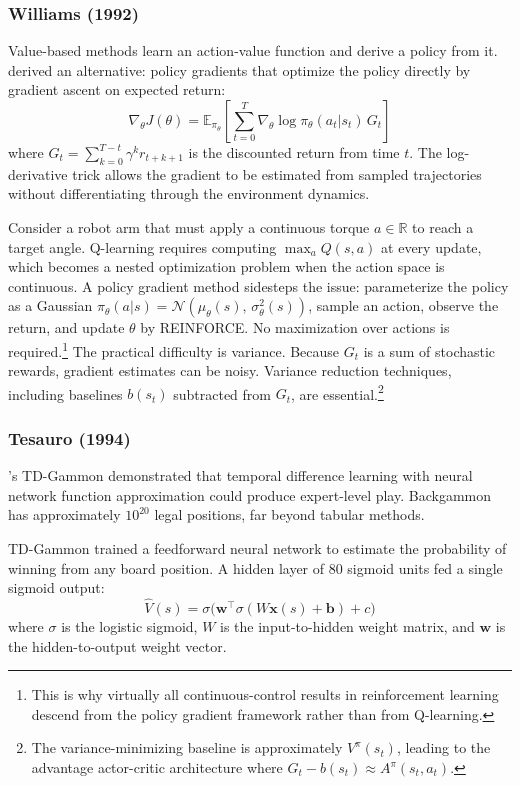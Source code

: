 \subsubsection{Williams (1992)}

Value-based methods learn an action-value function and derive a policy from it. \citet{williams1992} derived an alternative: policy gradients that optimize the policy directly by gradient ascent on expected return:
\begin{equation}
\nabla_\theta J(\theta) = \mathbb{E}_{\pi_\theta} \left[ \sum_{t=0}^{T} \nabla_\theta \log \pi_\theta(a_t|s_t) \, G_t \right]
\end{equation}
where $G_t = \sum_{k=0}^{T-t} \gamma^k r_{t+k+1}$ is the discounted return from time $t$. The log-derivative trick allows the gradient to be estimated from sampled trajectories without differentiating through the environment dynamics.

Consider a robot arm that must apply a continuous torque $a \in \mathbb{R}$ to reach a target angle. Q-learning requires computing $\max_a Q(s,a)$ at every update, which becomes a nested optimization problem when the action space is continuous. A policy gradient method sidesteps the issue: parameterize the policy as a Gaussian $\pi_\theta(a|s) = \mathcal{N}(\mu_\theta(s),\, \sigma_\theta^2(s))$, sample an action, observe the return, and update $\theta$ by REINFORCE. No maximization over actions is required.\footnote{This is why virtually all continuous-control results in reinforcement learning descend from the policy gradient framework rather than from Q-learning.} The practical difficulty is variance. Because $G_t$ is a sum of stochastic rewards, gradient estimates can be noisy. Variance reduction techniques, including baselines $b(s_t)$ subtracted from $G_t$, are essential.\footnote{The variance-minimizing baseline is approximately $V^\pi(s_t)$, leading to the advantage actor-critic architecture where $G_t - b(s_t) \approx A^\pi(s_t, a_t)$.}

\subsubsection{Tesauro (1994)}

\citet{tesauro1994}'s TD-Gammon demonstrated that temporal difference learning with neural network function approximation could produce expert-level play. Backgammon has approximately $10^{20}$ legal positions, far beyond tabular methods.

TD-Gammon trained a feedforward neural network to estimate the probability of winning from any board position. A hidden layer of 80 sigmoid units fed a single sigmoid output:
\begin{equation}
\hat{V}(s) = \sigma\!\bigl(\mathbf{w}^\top \sigma(W\mathbf{x}(s) + \mathbf{b}) + c\bigr)
\end{equation}
where $\sigma$ is the logistic sigmoid, $W$ is the input-to-hidden weight matrix, and $\mathbf{w}$ is the hidden-to-output weight vector.

